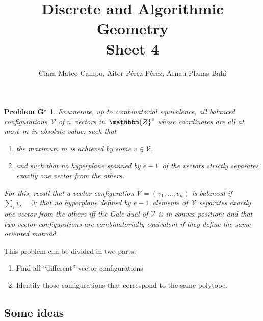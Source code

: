 \documentclass[11pt]{article}
\title{Discrete and Algorithmic Geometry \\Sheet 4}
\author{Clara Mateo Campo, Aitor Pérez Pérez, Arnau Planas Bahí}
\date{}
\newcommand{\Z}{\mathbbm{Z}}
\newcommand{\VV}{\mathcal{V}}
\newtheorem*{problemG*}{Problem G$^\star$}
\begin{document}
\maketitle

\begin{problemG*}
Enumerate, up to combinatorial equivalence, all balanced   configurations~$\VV$ of $n$~vectors in~$\Z^e$ whose coordinates are   all at most~$m$ in absolute value, such that
\begin{enumerate}
\item the maximum $m$ is achieved by some $v\in\VV$, 
\item and such that no hyperplane spanned by $e-1$~of the vectors   strictly separates exactly one vector from the others.
\end{enumerate}
\end{problemG*}

\emph{For this, recall that a vector configuration $\VV = (v_1,\dots,v_n)$ is balanced if $\sum_i v_i=0$;
that no hyperplane defined by $e-1$~elements of~$\VV$ separates   exactly one vector from the others iff the Gale dual of $\VV$ is in   convex position; and that two vector configurations are combinatorially equivalent if they define the same oriented matroid.}

\bigskip

This problem can be divided in two parts:

\begin{enumerate}
	\item Find all ``different'' vector configurations
	\item Identify those configurations that correspond to the same polytope.
\end{enumerate}

\subsection*{Some ideas}
\end{document}
